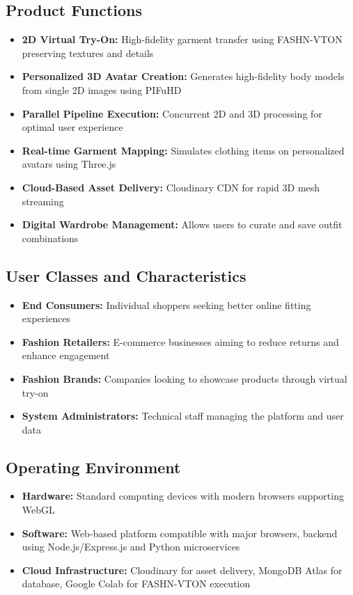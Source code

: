 \documentclass[12pt,a4paper,oneside]{report}
\begin{document}
\subsection{Product Functions}
\begin{itemize}
    \item \textbf{2D Virtual Try-On:} High-fidelity garment transfer using FASHN-VTON preserving textures and details
    \item \textbf{Personalized 3D Avatar Creation:} Generates high-fidelity body models from single 2D images using PIFuHD
    \item \textbf{Parallel Pipeline Execution:} Concurrent 2D and 3D processing for optimal user experience
    \item \textbf{Real-time Garment Mapping:} Simulates clothing items on personalized avatars using Three.js
    \item \textbf{Cloud-Based Asset Delivery:} Cloudinary CDN for rapid 3D mesh streaming
    \item \textbf{Digital Wardrobe Management:} Allows users to curate and save outfit combinations
\end{itemize}

\subsection{User Classes and Characteristics}
\begin{itemize}
    \item \textbf{End Consumers:} Individual shoppers seeking better online fitting experiences
    \item \textbf{Fashion Retailers:} E-commerce businesses aiming to reduce returns and enhance engagement
    \item \textbf{Fashion Brands:} Companies looking to showcase products through virtual try-on
    \item \textbf{System Administrators:} Technical staff managing the platform and user data
\end{itemize}

\subsection{Operating Environment}
\begin{itemize}
    \item \textbf{Hardware:} Standard computing devices with modern browsers supporting WebGL
    \item \textbf{Software:} Web-based platform compatible with major browsers, backend using Node.js/Express.js and Python microservices
    \item \textbf{Cloud Infrastructure:} Cloudinary for asset delivery, MongoDB Atlas for database, Google Colab for FASHN-VTON execution

\end{itemize}
\end{document}
